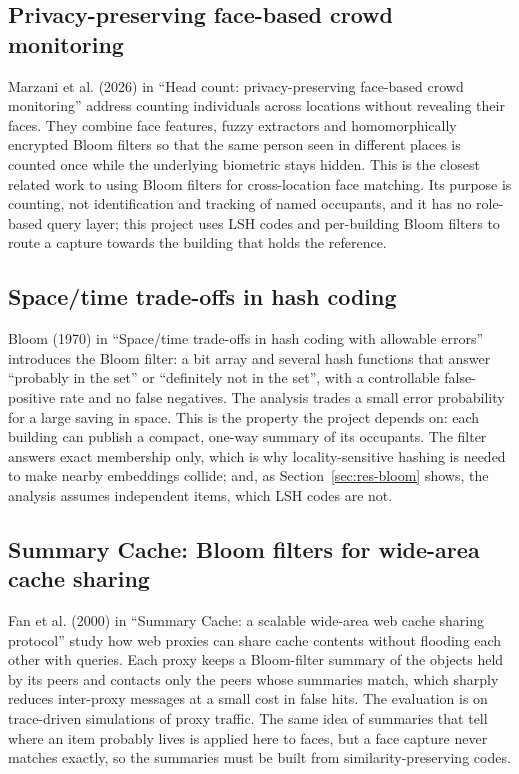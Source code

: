 \documentclass[12pt,a4paper,oneside]{report}
\begin{document}
\clearpage
\subsection{Privacy-preserving face-based crowd monitoring}
Marzani et al. (2026) in ``Head count: privacy-preserving face-based crowd monitoring'' \cite{ref11} address counting individuals across locations without revealing their faces. They combine face features, fuzzy extractors and homomorphically encrypted Bloom filters so that the same person seen in different places is counted once while the underlying biometric stays hidden. This is the closest related work to using Bloom filters for cross-location face matching. Its purpose is counting, not identification and tracking of named occupants, and it has no role-based query layer; this project uses LSH codes and per-building Bloom filters to route a capture towards the building that holds the reference.

\subsection{Space/time trade-offs in hash coding}
Bloom (1970) in ``Space/time trade-offs in hash coding with allowable errors'' \cite{ref12} introduces the Bloom filter: a bit array and several hash functions that answer ``probably in the set'' or ``definitely not in the set'', with a controllable false-positive rate and no false negatives. The analysis trades a small error probability for a large saving in space. This is the property the project depends on: each building can publish a compact, one-way summary of its occupants. The filter answers exact membership only, which is why locality-sensitive hashing is needed to make nearby embeddings collide; and, as Section~\ref{sec:res-bloom} shows, the analysis assumes independent items, which LSH codes are not.

\clearpage
\subsection{Summary Cache: Bloom filters for wide-area cache sharing}
Fan et al. (2000) in ``Summary Cache: a scalable wide-area web cache sharing protocol'' \cite{ref13} study how web proxies can share cache contents without flooding each other with queries. Each proxy keeps a Bloom-filter summary of the objects held by its peers and contacts only the peers whose summaries match, which sharply reduces inter-proxy messages at a small cost in false hits. The evaluation is on trace-driven simulations of proxy traffic. The same idea of summaries that tell where an item probably lives is applied here to faces, but a face capture never matches exactly, so the summaries must be built from similarity-preserving codes.
\end{document}
